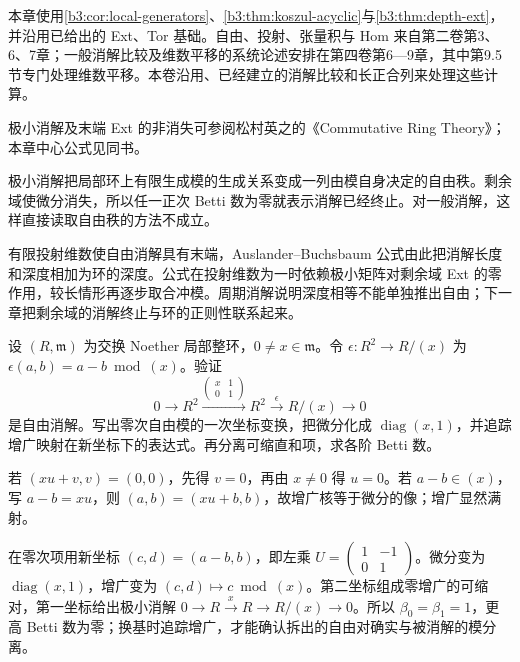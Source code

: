\ProseParagraphBreak

本章使用\cref{b3:cor:local-generators}、\cref{b3:thm:koszul-acyclic}与\cref{b3:thm:depth-ext}，并沿用已给出的 Ext、Tor 基础。自由、投射、张量积与 Hom 来自第二卷第3、6、7章；一般消解比较及维数平移的系统论述安排在第四卷第6—9章，其中第9.5节专门处理维数平移。本卷沿用、已经建立的消解比较和长正合列来处理这些计算。

\ProseParagraphBreak
极小消解及末端 Ext 的非消失可参阅松村英之的《Commutative Ring Theory》\cite[\S19, Minimal free resolutions, Lemma 1, pp. 153--154]{Matsumura1989CommutativeRingTheory}；本章中心公式见同书\cite[Theorem 19.1, p. 155]{Matsumura1989CommutativeRingTheory}。






\begin{chaptersummary}
	极小消解把局部环上有限生成模的生成关系变成一列由模自身决定的自由秩。剩余域使微分消失，所以任一正次 Betti 数为零就表示消解已经终止。对一般消解，这样直接读取自由秩的方法不成立。

	\ProseParagraphBreak
	有限投射维数使自由消解具有末端，Auslander–Buchsbaum 公式由此把消解长度和深度相加为环的深度。公式在投射维数为一时依赖极小矩阵对剩余域 Ext 的零作用，较长情形再逐步取合冲模。周期消解说明深度相等不能单独推出自由；下一章把剩余域的消解终止与环的正则性联系起来。
\end{chaptersummary}

\BookExercises

\begin{exercise}\label{b3:ex:17-contractible-summand}
	设 \((R,\mathfrak m)\) 为交换 Noether 局部整环，\(0\ne x\in\mathfrak m\)。令 \(\epsilon:R^2\to R/(x)\) 为 \(\epsilon(a,b)=a-b\bmod(x)\)。验证
	\[
		0\longrightarrow R^2\xrightarrow{\left(\begin{smallmatrix}x&1\\0&1\end{smallmatrix}\right)}R^2
		\xrightarrow{\epsilon}R/(x)\longrightarrow0
	\]
	是自由消解。写出零次自由模的一次坐标变换，把微分化成 \(\operatorname{diag}(x,1)\)，并追踪增广映射在新坐标下的表达式。再分离可缩直和项，求各阶 Betti 数。
\end{exercise}
\begin{solution}
	若 \((xu+v,v)=(0,0)\)，先得 \(v=0\)，再由 \(x\ne0\) 得 \(u=0\)。若 \(a-b\in(x)\)，写 \(a-b=xu\)，则 \((a,b)=(xu+b,b)\)，故增广核等于微分的像；增广显然满射。

	在零次项用新坐标 \((c,d)=(a-b,b)\)，即左乘 \(U=\left(\begin{smallmatrix}1&-1\\0&1\end{smallmatrix}\right)\)。微分变为 \(\operatorname{diag}(x,1)\)，增广变为 \((c,d)\mapsto c\bmod(x)\)。第二坐标组成零增广的可缩对，第一坐标给出极小消解 \(0\to R\xrightarrow{x}R\to R/(x)\to0\)。所以 \(\beta_0=\beta_1=1\)，更高 Betti 数为零；换基时追踪增广，才能确认拆出的自由对确实与被消解的模分离。
\end{solution}

